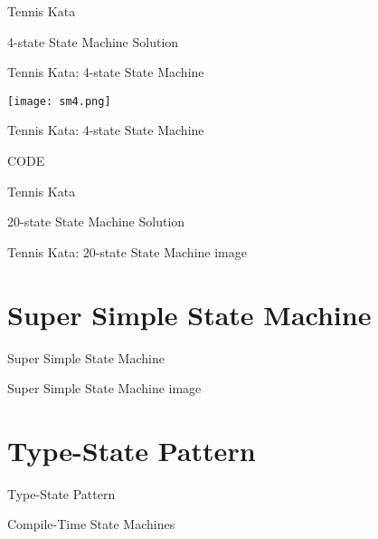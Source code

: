\documentclass[aspectratio=169]{beamer}
\begin{document}
\begin{frame}{Tennis Kata}
\begin{center}
\begin{Huge}4-state State Machine Solution
\end{Huge}
\end{center}
\end{frame}

\begin{frame}{Tennis Kata: 4-state State Machine}
\begin{center}
\texttt{[image: sm4.png]}
\end{center}
\end{frame}

\begin{frame}{Tennis Kata: 4-state State Machine}
\begin{center}
\begin{Huge}
CODE
\end{Huge}
\end{center}
\end{frame}


\begin{frame}{Tennis Kata}
\begin{Huge}20-state State Machine Solution
\end{Huge}
\end{frame}

\begin{frame}{Tennis Kata: 20-state State Machine}
image
\end{frame}

\section{Super Simple State Machine}
\begin{frame}
\begin{center}
\begin{Huge}
Super Simple State Machine
\end{Huge}
\end{center}
\end{frame}

\begin{frame}{Super Simple State Machine}
image
\end{frame}

\section{Type-State Pattern}
\begin{frame}
\begin{center}
\begin{Huge}
Type-State Pattern
\end{Huge}
\linebreak
\linebreak
\begin{Large}
Compile-Time State Machines
\end{Large}
\end{center}
\end{frame}
\end{document}
